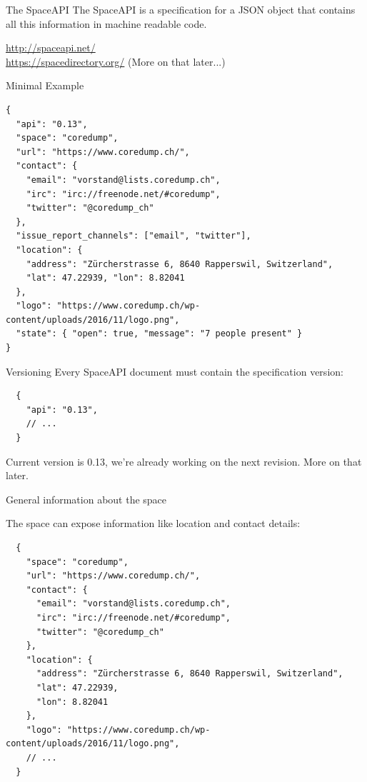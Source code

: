\begin{frame}[c]{The SpaceAPI}
	The SpaceAPI is a specification for a JSON object that contains all this
	information in machine readable code.

	\vspace{1em}
	\url{http://spaceapi.net/}\\\url{https://spacedirectory.org/} (More on that later...)
	\vspace{1em}
	
\end{frame}

\begin{frame}[fragile]{Minimal Example}
	\begin{verbatim}
{
  "api": "0.13",
  "space": "coredump",
  "url": "https://www.coredump.ch/",
  "contact": {
    "email": "vorstand@lists.coredump.ch",
    "irc": "irc://freenode.net/#coredump",
    "twitter": "@coredump_ch"
  },
  "issue_report_channels": ["email", "twitter"],
  "location": {
    "address": "Zürcherstrasse 6, 8640 Rapperswil, Switzerland",
    "lat": 47.22939, "lon": 8.82041
  },
  "logo": "https://www.coredump.ch/wp-content/uploads/2016/11/logo.png",
  "state": { "open": true, "message": "7 people present" }
}
	\end{verbatim}
\end{frame}

\begin{frame}[fragile]{Versioning}
Every SpaceAPI document must contain the specification version:

	\begin{verbatim}
  {
    "api": "0.13",
    // ...
  }
	\end{verbatim}

Current version is 0.13, we're already working on the next revision. More on
that later.
\end{frame}

\begin{frame}[fragile]{General information about the space}

The space can expose information like location and contact details:

	\begin{verbatim}
  {
    "space": "coredump",
    "url": "https://www.coredump.ch/",
    "contact": {
      "email": "vorstand@lists.coredump.ch",
      "irc": "irc://freenode.net/#coredump",
      "twitter": "@coredump_ch"
    },
    "location": {
      "address": "Zürcherstrasse 6, 8640 Rapperswil, Switzerland",
      "lat": 47.22939,
      "lon": 8.82041
    },
    "logo": "https://www.coredump.ch/wp-content/uploads/2016/11/logo.png",
    // ...
  }
	\end{verbatim}
\end{frame}

